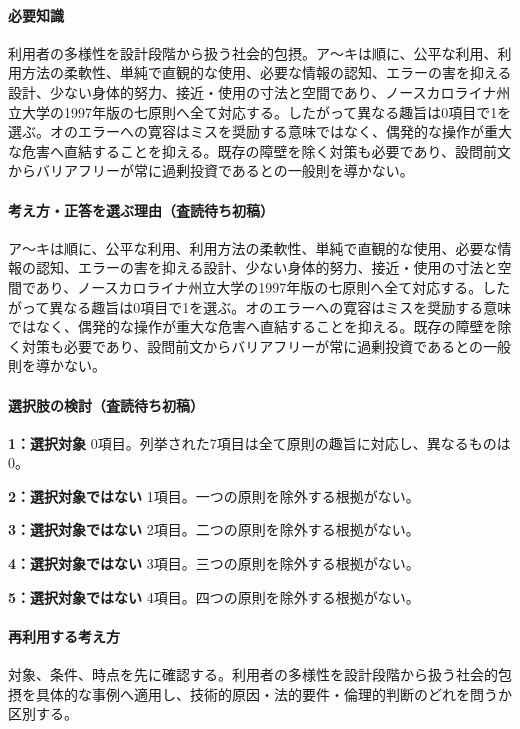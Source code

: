 \paragraph{必要知識} 利用者の多様性を設計段階から扱う社会的包摂。ア〜キは順に、公平な利用、利用方法の柔軟性、単純で直観的な使用、必要な情報の認知、エラーの害を抑える設計、少ない身体的努力、接近・使用の寸法と空間であり、ノースカロライナ州立大学の1997年版の七原則へ全て対応する。したがって異なる趣旨は0項目で1を選ぶ。オのエラーへの寛容はミスを奨励する意味ではなく、偶発的な操作が重大な危害へ直結することを抑える。既存の障壁を除く対策も必要であり、設問前文からバリアフリーが常に過剰投資であるとの一般則を導かない。

\paragraph{考え方・正答を選ぶ理由（査読待ち初稿）} ア〜キは順に、公平な利用、利用方法の柔軟性、単純で直観的な使用、必要な情報の認知、エラーの害を抑える設計、少ない身体的努力、接近・使用の寸法と空間であり、ノースカロライナ州立大学の1997年版の七原則へ全て対応する。したがって異なる趣旨は0項目で1を選ぶ。オのエラーへの寛容はミスを奨励する意味ではなく、偶発的な操作が重大な危害へ直結することを抑える。既存の障壁を除く対策も必要であり、設問前文からバリアフリーが常に過剰投資であるとの一般則を導かない。

\paragraph{選択肢の検討（査読待ち初稿）}\mbox{}\par

\noindent\textbf{1：選択対象} 0項目。列挙された7項目は全て原則の趣旨に対応し、異なるものは0。\par

\noindent\textbf{2：選択対象ではない} 1項目。一つの原則を除外する根拠がない。\par

\noindent\textbf{3：選択対象ではない} 2項目。二つの原則を除外する根拠がない。\par

\noindent\textbf{4：選択対象ではない} 3項目。三つの原則を除外する根拠がない。\par

\noindent\textbf{5：選択対象ではない} 4項目。四つの原則を除外する根拠がない。\par

\paragraph{再利用する考え方} 対象、条件、時点を先に確認する。利用者の多様性を設計段階から扱う社会的包摂を具体的な事例へ適用し、技術的原因・法的要件・倫理的判断のどれを問うか区別する。

